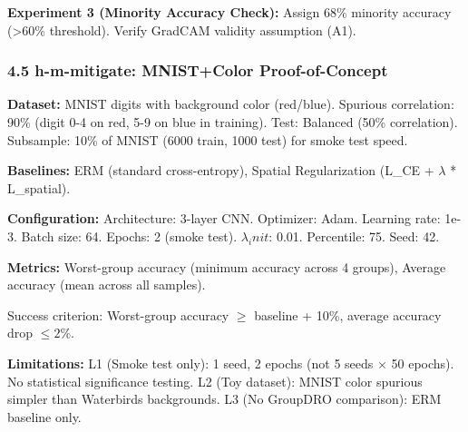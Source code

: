 \textbf{Experiment 3 (Minority Accuracy Check):} Assign 68\% minority accuracy (>60\% threshold). Verify GradCAM validity assumption (A1).

\subsubsection{4.5 h-m-mitigate: MNIST+Color Proof-of-Concept}

\textbf{Dataset:} MNIST digits with background color (red/blue). Spurious correlation: 90\% (digit 0-4 on red, 5-9 on blue in training). Test: Balanced (50\% correlation). Subsample: 10\% of MNIST (6000 train, 1000 test) for smoke test speed.

\textbf{Baselines:} ERM (standard cross-entropy), Spatial Regularization (L\_CE + $\lambda$ * L\_spatial).

\textbf{Configuration:} Architecture: 3-layer CNN. Optimizer: Adam. Learning rate: 1e-3. Batch size: 64. Epochs: 2 (smoke test). $\lambda _init$: 0.01. Percentile: 75. Seed: 42.

\textbf{Metrics:} Worst-group accuracy (minimum accuracy across 4 groups), Average accuracy (mean across all samples).

Success criterion: Worst-group accuracy $\geq$ baseline + 10\%, average accuracy drop $\leq 2$\%.

\textbf{Limitations:}  
L1 (Smoke test only): 1 seed, 2 epochs (not 5 seeds $\times$ 50 epochs). No statistical significance testing.  
L2 (Toy dataset): MNIST color spurious simpler than Waterbirds backgrounds.  
L3 (No GroupDRO comparison): ERM baseline only.
